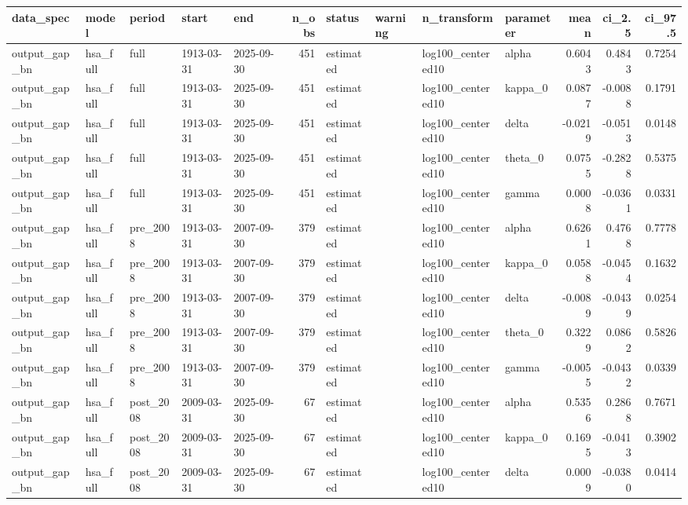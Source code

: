 \begin{tabular}{lllllrllllrrr}
\toprule
data\_spec & model & period & start & end & n\_obs & status & warning & n\_transform & parameter & mean & ci\_2.5 & ci\_97.5 \\
\midrule
output\_gap\_bn & hsa\_full & full & 1913-03-31 & 2025-09-30 & 451 & estimated &  & log100\_centered10 & alpha & 0.6043 & 0.4843 & 0.7254 \\
output\_gap\_bn & hsa\_full & full & 1913-03-31 & 2025-09-30 & 451 & estimated &  & log100\_centered10 & kappa\_0 & 0.0877 & -0.0088 & 0.1791 \\
output\_gap\_bn & hsa\_full & full & 1913-03-31 & 2025-09-30 & 451 & estimated &  & log100\_centered10 & delta & -0.0219 & -0.0513 & 0.0148 \\
output\_gap\_bn & hsa\_full & full & 1913-03-31 & 2025-09-30 & 451 & estimated &  & log100\_centered10 & theta\_0 & 0.0755 & -0.2828 & 0.5375 \\
output\_gap\_bn & hsa\_full & full & 1913-03-31 & 2025-09-30 & 451 & estimated &  & log100\_centered10 & gamma & 0.0008 & -0.0361 & 0.0331 \\
output\_gap\_bn & hsa\_full & pre\_2008 & 1913-03-31 & 2007-09-30 & 379 & estimated &  & log100\_centered10 & alpha & 0.6261 & 0.4768 & 0.7778 \\
output\_gap\_bn & hsa\_full & pre\_2008 & 1913-03-31 & 2007-09-30 & 379 & estimated &  & log100\_centered10 & kappa\_0 & 0.0588 & -0.0454 & 0.1632 \\
output\_gap\_bn & hsa\_full & pre\_2008 & 1913-03-31 & 2007-09-30 & 379 & estimated &  & log100\_centered10 & delta & -0.0089 & -0.0439 & 0.0254 \\
output\_gap\_bn & hsa\_full & pre\_2008 & 1913-03-31 & 2007-09-30 & 379 & estimated &  & log100\_centered10 & theta\_0 & 0.3229 & 0.0862 & 0.5826 \\
output\_gap\_bn & hsa\_full & pre\_2008 & 1913-03-31 & 2007-09-30 & 379 & estimated &  & log100\_centered10 & gamma & -0.0055 & -0.0432 & 0.0339 \\
output\_gap\_bn & hsa\_full & post\_2008 & 2009-03-31 & 2025-09-30 & 67 & estimated &  & log100\_centered10 & alpha & 0.5356 & 0.2868 & 0.7671 \\
output\_gap\_bn & hsa\_full & post\_2008 & 2009-03-31 & 2025-09-30 & 67 & estimated &  & log100\_centered10 & kappa\_0 & 0.1695 & -0.0413 & 0.3902 \\
output\_gap\_bn & hsa\_full & post\_2008 & 2009-03-31 & 2025-09-30 & 67 & estimated &  & log100\_centered10 & delta & 0.0009 & -0.0380 & 0.0414 \\

\end{tabular}
